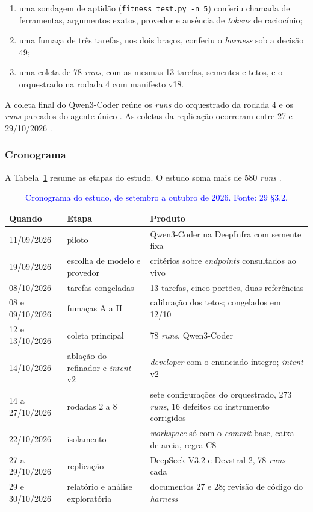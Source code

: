 \begin{novobloco}
\begin{enumerate}
    \item uma sondagem de aptidão (\texttt{fitness\_test.py -n 5}) conferiu chamada de ferramentas, argumentos exatos, provedor e ausência de \textit{tokens} de raciocínio;
    \item uma fumaça de três tarefas, nos dois braços, conferiu o \textit{harness} sob a decisão 49;
    \item uma coleta de 78 \textit{runs}, com as mesmas 13 tarefas, sementes e tetos, e o orquestrado na rodada 4 com manifesto v18.
\end{enumerate}

A coleta final do Qwen3-Coder reúne os \textit{runs} do orquestrado da rodada 4 e os \textit{runs} pareados do agente único . As coletas da replicação ocorreram entre 27 e 29/10/2026 .

\subsubsection{Cronograma}

A Tabela~\ref{tab-cronograma} resume as etapas do estudo. O estudo soma mais de 580 \textit{runs} .

\begin{table}[t]
\centering
\color{blue}
\caption{\textcolor{blue}{Cronograma do estudo, de setembro a outubro de 2026. Fonte: 29 \S3.2.}}
\label{tab-cronograma}
\small
\begin{tabular}{p{3.0cm}p{5.0cm}p{7.6cm}}
\toprule
Quando & Etapa & Produto \\
\midrule
11/09/2026 & piloto & Qwen3-Coder na DeepInfra com semente fixa \\
19/09/2026 & escolha de modelo e provedor & critérios sobre \textit{endpoints} consultados ao vivo \\
08/10/2026 & tarefas congeladas & 13 tarefas, cinco portões, duas referências \\
08 e 09/10/2026 & fumaças A a H & calibração dos tetos; congelados em 12/10 \\
12 e 13/10/2026 & coleta principal & 78 \textit{runs}, Qwen3-Coder \\
14/10/2026 & ablação do refinador e \textit{intent} v2 & \textit{developer} com o enunciado íntegro; \textit{intent} v2 \\
14 a 27/10/2026 & rodadas 2 a 8 & sete configurações do orquestrado, 273 \textit{runs}, 16 defeitos do instrumento corrigidos \\
22/10/2026 & isolamento & \textit{workspace} só com o \textit{commit}-base, caixa de areia, regra C8 \\
27 a 29/10/2026 & replicação & DeepSeek V3.2 e Devstral 2, 78 \textit{runs} cada \\
29 e 30/10/2026 & relatório e análise exploratória & documentos 27 e 28; revisão de código do \textit{harness} \\
\bottomrule
\end{tabular}
\end{table}
\end{novobloco}


